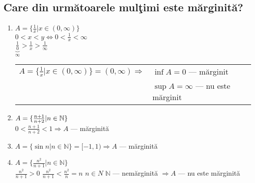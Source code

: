 \documentclass[a4paper, 12pt, notitlepage]{book}
\begin{document}
    \subsection{Care din urm\u{a}toarele mul\c{t}imi este m\u{a}rginit\u{a}?}
    \begin{enumerate}
      \item $A = \{ \frac{1}{x} \vert x \in (0,\infty) \}$\\[5pt]
            $0 < x < y \Leftrightarrow 0 < \frac{1}{x} < \infty$\\[5pt]
            $\underbrace{\frac{1}{0}}_{\infty} > \frac{1}{x} > \frac{1}{\infty} $\\[5pt]
            \begin{tabular}{ll}
              $A = \{ \frac{1}{x} \vert x \in (0,\infty) \} = (0, \infty) \Rightarrow$ & $\inf A = 0$ --- m\u{a}rginit\\
                                                                                       & $\sup A = \infty$ --- nu este m\u{a}rginit
            \end{tabular}
      \item $A = \{ \frac{n+1}{n+2} \arrowvert n \in \mathbb{N} \}$\\[5pt]
            $0 < \frac{n+1}{n+2} < 1 \Rightarrow A$ --- m\u{a}rginit\u{a}
      \item $A = \{ \sin n | n \in \mathbb{N} \} = [-1, 1) \Rightarrow A$ --- m\u{a}rginit\u{a}
      \item $A = \{ \frac{n^{2}}{n+1} | n \in \mathbb{N} \}$\\[5pt]
            $\frac{n^{2}}{n+1} > 0$
            $\frac{n^{2}}{n+1} < \frac{n^{2}}{n} = n$
            $n \in N$
            $\mathbb{N}$ --- nem\u{a}rginit\u{a}
            $\Rightarrow A$ --- nu este m\u{a}rginit\u{a}

    \end{enumerate}
\end{document}
